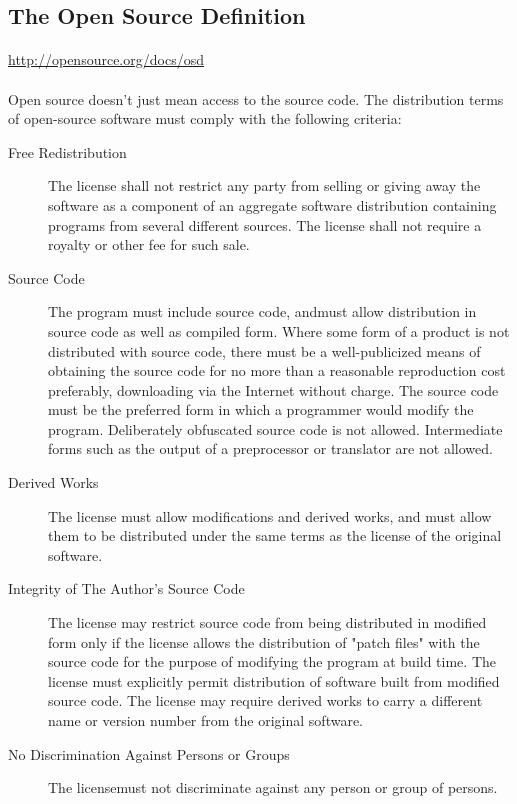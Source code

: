 \documentclass[11pt,titlepage]{book}
\begin{document}
\begin{appendices}
\section{The Open Source Definition}
\paragraph{}\url{http://opensource.org/docs/osd}
\paragraph{}Open source doesn't just mean access to the source code. The distribution terms of open-source software must comply with the following criteria:
\begin{description}
\item[Free Redistribution]{The license shall not restrict any party from selling or giving away the software as a component of an aggregate software distribution containing programs from several different sources. The license shall not require a royalty or other fee for such sale.}
\item[Source Code]{The program must include source code, and\linebreak must allow distribution in source code as well as compiled form. Where some form of a product is not distributed with source code, there must be a well-publicized means of obtaining the source code for no more than a reasonable reproduction cost preferably, downloading via the Internet without charge. The source code must be the preferred form in which a programmer would modify the program. Deliberately obfuscated source code is not allowed. Intermediate forms such as the output of a preprocessor or translator are not allowed.}
\item[Derived Works]{The license must allow modifications and derived works, and must allow them to be distributed under the same terms as the license of the original software.}
\item[Integrity of The Author's Source Code]{The license may restrict source code from being distributed in modified form only if the license allows the distribution of "patch files" with the source code for the purpose of modifying the program at build time. The license must explicitly permit distribution of software built from modified source code. The license may require derived works to carry a different name or version number from the original software.}
\item[No Discrimination Against Persons or Groups]{The license\linebreak must not discriminate against any person or group of persons.}

\end{description}
\end{appendices}
\end{document}
